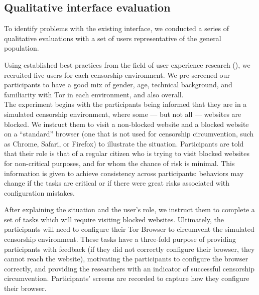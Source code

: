\documentclass{template}
\begin{document}
\subsection{Qualitative interface evaluation}
To identify problems with the existing interface, we conducted a series of
qualitative evaluations with a set of users representative of the general
population.

Using established best practices from the field of user experience research
(\cite{howmanyusers}), we recruited five users for each censorship environment.
We pre-screened our participants to have a good mix of gender, age, technical
background, and familiarity with Tor in each environment, and also overall. \\


The experiment begins with the participants being informed that they are in a
simulated censorship
environment, where some --- but not all --- websites are blocked. We
instruct them to visit a non-blocked website and a blocked website on a
``standard'' browser (one that is not used for censorship circumvention, such
as Chrome, Safari, or Firefox) to illustrate the situation.
Participants are told that their
role is that of a regular citizen who is trying to visit blocked websites
for non-critical purposes,
and for whom the chance of risk is minimal. This information is given
to achieve
consistency across participants: behaviors may change if the tasks are
critical or if there were great risks associated with configuration mistakes. 

After explaining the situation and the user's role, we
instruct them to complete a set of
tasks which will require visiting blocked websites. Ultimately, the
participants will need to configure their Tor Browser to circumvent the
simulated censorship environment. These tasks have a three-fold purpose of
providing participants with feedback (if they did not correctly configure their
browser, they cannot reach the website), motivating the participants to
configure the browser correctly, and providing the researchers with an
indicator of successful censorship circumvention.
Participants' screens are recorded to capture how they configure
their browser.
\end{document}
